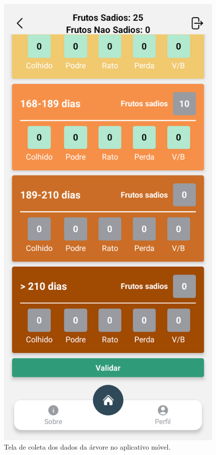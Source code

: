 \begin{figure}[H]
\begin{minipage}[b]{0.30\textwidth}
    \end{minipage}
    \hspace{3pt}
    \begin{minipage}[b]{0.30\textwidth}
        \centering
        \includegraphics[width=\textwidth]{images/app/12-collect.png}
    \end{minipage}
    \hspace{3pt}
    
    \caption{Tela de coleta dos dados da árvore no aplicativo móvel.}
    \label{fig:CollectDataScreen}
\end{figure}


